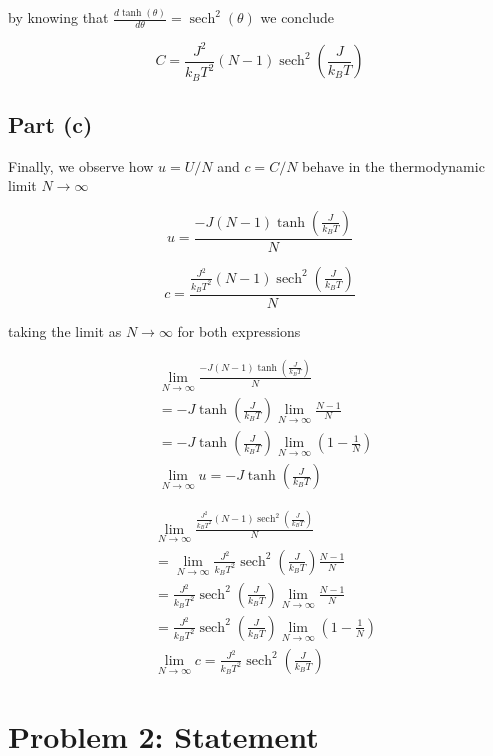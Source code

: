 ﻿\documentclass[11pt]{article}
\begin{document}
by knowing that
\(\frac{d \tanh(\theta)}{d\theta}=\operatorname{sech}^2(\theta)\) we
conclude

\[
\boxed{C = \frac{J^2}{k_B T^2}(N-1)\operatorname{sech}^2\left(\frac{J}{k_B T}\right)} \tag{17}
\]

    \subsection*{Part (c)}

Finally, we observe how \(u=U/N\) and \(c=C/N\) behave in the
thermodynamic limit \(N \to \infty\)

\[
u=\frac{-J(N-1)\tanh\left(\frac{J}{k_B T}\right)}{N}
\]

\[
c=\frac{\frac{J^2}{k_B T^2}(N-1)\operatorname{sech}^2\left(\frac{J}{k_B T}\right)}{N}
\]

taking the limit as \(N \to \infty\) for both expressions

\[
\begin{aligned}
&\lim_{N \to \infty} \frac{-J(N-1)\tanh\left(\frac{J}{k_B T}\right)}{N} \\
&= -J\tanh\left(\frac{J}{k_B T}\right) \lim_{N \to \infty} \frac{N-1}{N} \\
&= -J\tanh\left(\frac{J}{k_B T}\right) \lim_{N \to \infty} \left(1-\frac{1}{N}\right) \\
&\lim_{N \to \infty} u= \boxed{-J\tanh\left(\frac{J}{k_B T}\right)}
\end{aligned} \tag{18}
\]

\[
\begin{aligned}
&\lim_{N \to \infty} \frac{\frac{J^2}{k_B T^2}(N-1)\operatorname{sech}^2\left(\frac{J}{k_B T}\right)}{N} \\
&= \lim_{N \to \infty} \frac{J^2}{k_B T^2}\operatorname{sech}^2\left(\frac{J}{k_B T}\right)\frac{N-1}{N} \\
&= \frac{J^2}{k_B T^2}\operatorname{sech}^2\left(\frac{J}{k_B T}\right) \lim_{N \to \infty} \frac{N-1}{N} \\
&= \frac{J^2}{k_B T^2}\operatorname{sech}^2\left(\frac{J}{k_B T}\right) \lim_{N \to \infty} \left(1-\frac{1}{N}\right) \\
& \boxed{\lim_{N \to \infty} c=\frac{J^2}{k_B T^2}\operatorname{sech}^2\left(\frac{J}{k_B T}\right)}
\end{aligned} \tag{19}
\]

    \section*{Problem 2: Statement}\label{problem-2-statement}
\end{document}

